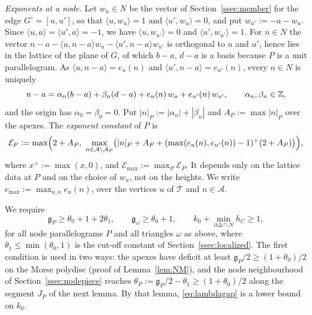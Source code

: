 \begin{definition}
\emph{Exponents at a node.} Let $w_u\in N$ be the vector of Section~\ref{ssec:member} for the edge $G^\circ=[u,u']$, so
that $\langle u,w_u\rangle=1$ and $\langle u',w_u\rangle=0$, and put $w_{u'}:=-a-w_u$. Since
$\langle u,a\rangle=\langle u',a\rangle=-1$, we have $\langle u,w_{u'}\rangle=0$ and $\langle u',w_{u'}\rangle=1$. For
$n\in N$ the vector $n-a-\langle u,n-a\rangle w_u-\langle u',n-a\rangle w_{u'}$ is orthogonal to $u$ and $u'$, hence lies
in the lattice of the plane of $G$, of which $b-a$, $d-a$ is a basis because $P$ is a unit parallelogram. As
$\langle u,n-a\rangle=e_u(n)$ and $\langle u',n-a\rangle=e_{u'}(n)$, every $n\in N$ is uniquely
\begin{equation}\label{eq:nodeexp}
n-a=\alpha_n(b-a)+\beta_n(d-a)+e_u(n)\,w_u+e_{u'}(n)\,w_{u'},\qquad \alpha_n,\beta_n\in\mathbb Z,
\end{equation}
and the origin has $\alpha_0=\beta_0=0$. Put $|n|_P:=|\alpha_n|+|\beta_n|$ and $A_P:=\max|n|_P$ over the apexes. The
\emph{exponent constant} of $P$ is
\[
\mathcal E_P:=\max\Bigl(2+A_P,\ \max_{n\in\mathcal A\setminus\mathcal A_P}\bigl(|n|_P+A_P+(\max(e_u(n),e_{u'}(n))-1)^+(2+A_P)\bigr)\Bigr),
\]
where $x^+:=\max(x,0)$, and $\mathcal E_{\max}:=\max_P\mathcal E_P$. It depends only on the lattice data at $P$ and on the
choice of $w_u$, not on the heights. We write $e_{\max}:=\max_{u,n}e_u(n)$, over the vertices $u$ of $\mathcal T$ and
$n\in\mathcal A$.
\end{definition}

We require
\begin{equation}\label{eq:lambdagap}
\mathfrak g_P\ge\theta_0+1+2\theta_1,\qquad\mathfrak g_\omega\ge\theta_0+1,\qquad k_0+\min_{\partial\Delta\cap N}h_C\ge1,
\end{equation}
for all node parallelograms $P$ and all triangles $\omega$ as above, where $\theta_1\le\min(\theta_0,1)$ is the cut-off
constant of Section~\ref{ssec:localized}. The first condition is used in two ways: the apexes have deficit at least
$\mathfrak g_P/2\ge(1+\theta_0)/2$ on the Morse polydisc (proof of Lemma~\ref{lem:NM}), and the node neighbourhood of
Section~\ref{ssec:nodepiece} reaches $\theta_P:=\mathfrak g_P/2-\theta_1\ge(1+\theta_0)/2$ along the segment $J_P$ of the
next lemma. By that lemma, \eqref{eq:lambdagap} is a lower bound on $k_0$.

